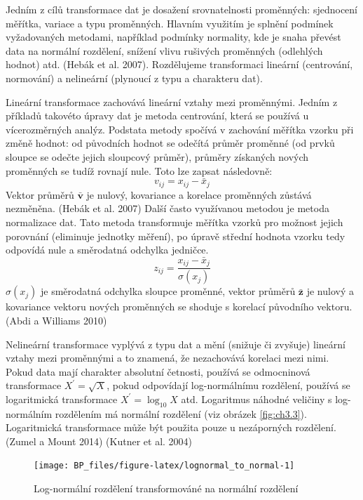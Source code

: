\documentclass[12pt,]{article}
\begin{document}
\qquad Jedním z cílů transformace dat je dosažení srovnatelnosti
proměnných: sjednocení měřítka, variace a typu proměnných. Hlavním
využitím je splnění podmínek vyžadovaných metodami, například podmínky
normality, kde je snaha převést data na normální rozdělení, snížení
vlivu rušivých proměnných (odlehlých hodnot) atd. (Hebák et al. 2007).
Rozdělujeme transformaci lineární (centrování, normování) a nelineární
(plynoucí z typu a charakteru dat).

\qquad Lineární transformace zachovává lineární vztahy mezi proměnnými.
Jedním z příkladů takovéto úpravy dat je metoda centrování, která se
používá u vícerozměrných analýz. Podstata metody spočívá v zachování
měřítka vzorku při změně hodnot: od původních hodnot se odečítá průměr
proměnné (od prvků sloupce se odečte jejich sloupcový průměr), průměry
získaných nových proměnných se tudíž rovnají nule. Toto lze zapsat
následovně: \[v_{ij} = x_{ij} - \bar{x}_j\] Vektor průměrů
\(\bar{\bm{v}}\) je nulový, kovariance a korelace proměnných zůstává
nezměněna. (Hebák et al. 2007) Další často využívanou metodou je metoda
normalizace dat. Tato metoda transformuje měřítka vzorků pro možnost
jejich porovnání (eliminuje jednotky měření), po úpravě střední hodnota
vzorku tedy odpovídá nule a směrodatná odchylka jedničce.
\[z_{ij} = \frac{x_{ij} - \bar{x}_j}{\sigma(x_j)}\] \(\sigma(x_j)\) je
směrodatná odchylka sloupce proměnné, vektor průměrů \(\bar{\bm{z}}\) je
nulový a kovariance vektoru nových proměnných se shoduje s korelací
původního vektoru. (Abdi a Williams 2010)

\qquad Nelineární transformace vyplývá z typu dat a mění (snižuje či
zvyšuje) lineární vztahy mezi proměnnými a to znamená, že nezachovává
korelaci mezi nimi. Pokud data mají charakter absolutní četnosti,
používá se odmocninová transformace \(X^{\prime} = \sqrt{X}\), pokud
odpovídají log-normálnímu rozdělení, používá se logaritmická
transformace \(X^{\prime} = \log_{10}X\) atd. Logaritmus náhodné
veličiny s log-normálním rozdělením má normální rozdělení (viz obrázek
\ref{fig:ch3.3}). Logaritmická transformace může být použita pouze u
nezáporných rozdělení. (Zumel a Mount 2014) (Kutner et al. 2004)

\begin{figure}[H]

{\centering \texttt{[image: BP\_files/figure-latex/lognormal\_to\_normal-1]} 

}

\caption{\label{fig:ch3.3} Log-normální rozdělení transformováné na normální rozdělení}\label{fig:lognormal_to_normal}
\end{figure}
\end{document}
